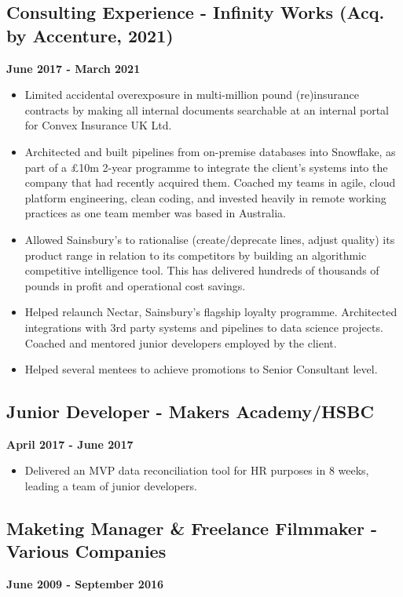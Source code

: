 \documentclass[a4paper]{scrartcl}
\begin{document}
\subsection*{Consulting Experience - Infinity Works (Acq. by Accenture, 2021)}
\textbf{June 2017 - March 2021}
\begin{itemize}
	\item Limited accidental overexposure in multi-million pound
	      (re)insurance contracts by making
	      all internal documents searchable at an internal portal for Convex
	      Insurance UK Ltd.
	\item Architected and built pipelines from on-premise databases into
	      Snowflake, as part of a £10m 2-year programme to integrate the
	      client's systems into the company that had recently acquired them.
	      Coached my teams in agile, cloud platform engineering, clean
	      coding,
	      and invested heavily in remote working practices as one team member
	      was based
	      in Australia.
	\item Allowed Sainsbury's to rationalise (create/deprecate lines, adjust
	      quality) its product range in relation to its competitors by
	      building an
	      algorithmic competitive intelligence tool. This has delivered
	      hundreds of
	      thousands of pounds in profit and operational cost savings.
	\item Helped relaunch Nectar, Sainsbury's flagship
	      loyalty programme. Architected integrations with 3rd party systems
	      and pipelines to data science projects. Coached and mentored junior
	      developers
	      employed by the client.
	\item Helped several mentees to achieve
	      promotions to Senior Consultant level.
\end{itemize}

\subsection*{Junior Developer - Makers Academy/HSBC}
\textbf{April 2017 - June 2017}
\begin{itemize}
	\item Delivered an MVP data reconciliation tool for HR purposes in 8
	      weeks, leading a team of junior developers.
\end{itemize}

\subsection*{Maketing Manager \& Freelance Filmmaker - Various Companies}
\textbf{June 2009 - September 2016}
\end{document}
